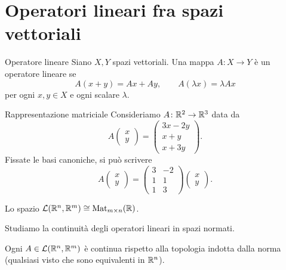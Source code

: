 \documentclass[a4paper]{article}
\begin{document}
\section{Operatori lineari fra spazi vettoriali}

\begin{snippetdefinition}{Operatore lineare}
    Siano \(X,Y\) spazi vettoriali. Una mappa \(A\colon X\to Y\) è un operatore lineare se
    \[
        A(x+y)=Ax+Ay,
        \qquad
        A(\lambda x)=\lambda Ax
    \]
    per ogni \(x,y\in X\) e ogni scalare \(\lambda\).
\end{snippetdefinition}

\begin{snippetexample}{Rappresentazione matriciale}
    Consideriamo \(A\colon\mathbb{R}^2\to\mathbb{R}^3\) data da
    \[
        A\begin{pmatrix}x\\y\end{pmatrix}
        =
        \begin{pmatrix}
            3x-2y\\
            x+y\\
            x+3y
        \end{pmatrix}.
    \]
    Fissate le basi canoniche, si può scrivere
    \[
        A\begin{pmatrix}x\\y\end{pmatrix}
        =
        \begin{pmatrix}
            3&-2\\
            1&1\\
            1&3
        \end{pmatrix}
        \begin{pmatrix}x\\y\end{pmatrix}.
    \]
\end{snippetexample}

Lo spazio \(\mathcal{L}(\mathbb{R}^n, \mathbb{R}^m) \cong \text{Mat}_{m\times n}(\mathbb{R})\).

Studiamo la continuità degli operatori lineari in spazi normati.

\begin{snippetproposition}{}
    Ogni \(A \in \mathcal{L}(\mathbb{R}^n, \mathbb{R}^m)\)
    è continua rispetto alla topologia indotta dalla norma (qualsiasi visto che sono equivalenti in \(\mathbb{R}^n\)).
\end{snippetproposition}
\end{document}
